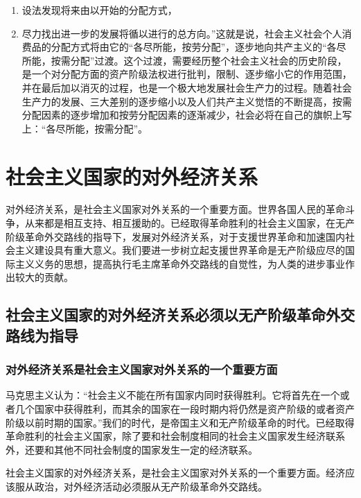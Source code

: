 \documentclass{book}
\begin{document}
 \begin{enumerate}

\item 设法发现将来由以开始的分配方式，
\item 尽力找出进一步的发展将循以进行的总方向。”这就是说，社会主义社会个人消费品的分配方式将由它的“各尽所能，按劳分配”，逐步地向共产主义的“各尽所能，按需分配”过渡。这个过渡，需要经历整个社会主义社会的历史阶段，是一个对分配方面的资产阶级法权进行批判，限制、逐步缩小它的作用范围，并在最后加以消灭的过程，也是一个极大地发展社会生产力的过程。随着社会生产力的发展、三大差别的逐步缩小以及人们共产主义觉悟的不断提高，按需分配因素的逐步增加和按劳分配因素的逐渐减少，社会必将在自己的旗帜上写上：“各尽所能，按需分配”。

 \end{enumerate}

\chapter{社会主义国家的对外经济关系}

对外经济关系，是社会主义国家对外关系的一个重要方面。世界各国人民的革命斗争，从来都是相互支持、相互援助的。已经取得革命胜利的社会主义国家，在无产阶级革命外交路线的指导下，发展对外经济关系，对于支援世界革命和加速国内社会主义建设具有重大意义。我们要进一步树立起支援世界革命是无产阶级应尽的国际主义义务的思想，提高执行毛主席革命外交路线的自觉性，为人类的进步事业作出较大的贡献。

\section{社会主义国家的对外经济关系必须以无产阶级革命外交路线为指导}

\subsection{对外经济关系是社会主义国家对外关系的一个重要方面}

马克思主义认为：“社会主义不能在所有国家内同时获得胜利。它将首先在一个或者几个国家中获得胜利，而其余的国家在一段时期内将仍然是资产阶级的或者资产阶级以前时期的国家。”我们的时代，是帝国主义和无产阶级革命的时代。已经取得革命胜利的社会主义国家，除了要和社会制度相同的社会主义国家发生经济联系外，还要和其他不同社会制度的国家发生一定的经济联系。

社会主义国家的对外经济关系，是社会主义国家对外关系的一个重要方面。经济应该服从政治，对外经济活动必须服从无产阶级革命外交路线。
\end{document}

